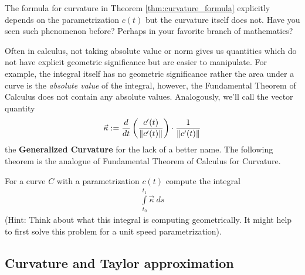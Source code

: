 The formula for curvature in Theorem \ref{thm:curvature_formula} explicitly depends on the parametrization $ c(t)$ but the curvature itself does not. Have you seen such phenomenon before? Perhaps in your favorite branch of mathematics?
\begin{remark}
	\label{remark:signed_curvature}
	Often in calculus, not taking absolute value or norm gives us quantities which do not have explicit geometric significance but are easier to manipulate. For example, the integral itself has no geometric significance rather the area under a curve is the \emph{absolute value} of the integral, however, the Fundamental Theorem of Calculus does not contain any absolute values. Analogously, we'll call the vector quantity
	\begin{align*}
		\vec{\kappa} := \dfrac{d}{dt} \left( \dfrac{c'(t)}{\lVert c'(t) \rVert}\right) \cdot \dfrac{1}{\lVert c'(t) \rVert}
	\end{align*}
the \textbf{Generalized Curvature} for the lack of a better name. The following theorem is the analogue of Fundamental Theorem of Calculus for Curvature.
\end{remark}
\begin{ques}
	For a curve $C$ with a parametrization $c(t)$ compute the integral
	\begin{align*}
		\int \limits_{t_0}^{t_1} \vec \kappa \: ds
	\end{align*}
	(Hint: Think about what this integral is computing geometrically. It might help to first solve this problem for a unit speed parametrization).
\end{ques}



\subsection{Curvature and Taylor approximation}

